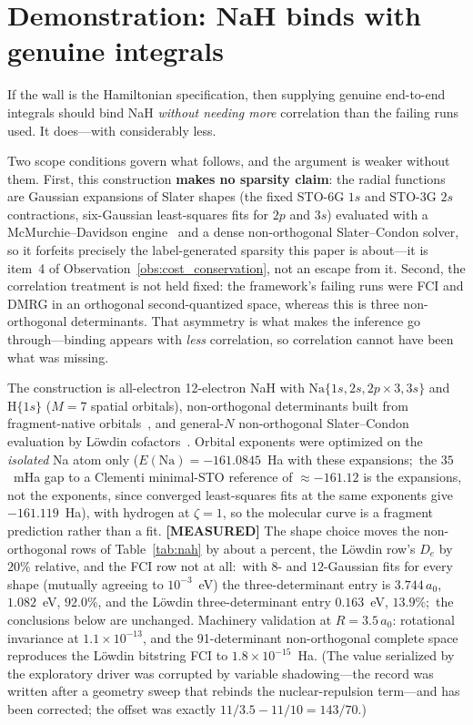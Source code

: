 \documentclass[aps,pra,twocolumn,superscriptaddress,longbibliography]{revtex4-2}
\begin{document}
\section{Demonstration: NaH binds with genuine integrals}
\label{sec:nah}

If the wall is the Hamiltonian specification, then supplying genuine
end-to-end integrals should bind NaH \emph{without needing more}
correlation than the failing runs used.  It does---with considerably less.

Two scope conditions govern what follows, and the argument is weaker
without them.  First, this construction \textbf{makes no sparsity claim}:
the radial functions are Gaussian expansions of Slater shapes (the
fixed STO-6G $1s$ and STO-3G $2s$ contractions, six-Gaussian least-squares
fits for $2p$ and $3s$) evaluated with
a McMurchie--Davidson engine~\cite{mcmurchie1978} and a dense
non-orthogonal Slater--Condon solver, so it forfeits precisely the
label-generated sparsity this paper is about---it is item~4 of
Observation~\ref{obs:cost_conservation}, not an escape from it.  Second,
the correlation treatment is not held fixed: the framework's failing runs
were FCI and DMRG in an orthogonal second-quantized space, whereas this is
three non-orthogonal determinants.  That asymmetry is what makes the
inference go through---binding appears with \emph{less} correlation, so
correlation cannot have been what was missing.

The construction is all-electron 12-electron NaH with
$\mathrm{Na}\{1s, 2s, 2p \times 3, 3s\}$ and $\mathrm{H}\{1s\}$
($M = 7$ spatial orbitals), non-orthogonal determinants built from
fragment-native orbitals~\cite{thom2009, sundstrom2014}, and general-$N$
non-orthogonal Slater--Condon evaluation by L\"owdin
cofactors~\cite{lowdin1955}.  Orbital exponents were optimized on
the \emph{isolated} Na atom only ($E(\mathrm{Na}) = -161.0845$~Ha with
these expansions;\ the $35$~mHa gap to a Clementi minimal-STO reference of
$\approx -161.12$ is the expansions, not the exponents, since converged
least-squares fits at the same exponents give $-161.119$~Ha), with
hydrogen at $\zeta = 1$, so the molecular curve is a fragment prediction
rather than a fit.  \textbf{[MEASURED]} The shape choice moves the
non-orthogonal rows of Table~\ref{tab:nah} by about a percent, the
L\"owdin row's $D_e$ by $20\%$ relative, and the FCI row not at all:\ with
$8$- and $12$-Gaussian fits for every shape (mutually agreeing to
$10^{-3}$~eV) the three-determinant entry is
$3.744\,a_0$, $1.082$~eV, $92.0\%$, and the L\"owdin three-determinant
entry $0.163$~eV, $13.9\%$;\ the conclusions below are unchanged.  Machinery validation at $R = 3.5\,a_0$: rotational invariance at
$1.1 \times 10^{-13}$, and the 91-determinant non-orthogonal complete space
reproduces the L\"owdin bitstring FCI to $1.8 \times 10^{-15}$~Ha.  (The
value serialized by the exploratory driver was corrupted by variable
shadowing---the record was written after a geometry sweep that rebinds the
nuclear-repulsion term---and has been corrected; the offset was exactly
$11/3.5 - 11/10 = 143/70$.)
\end{document}
